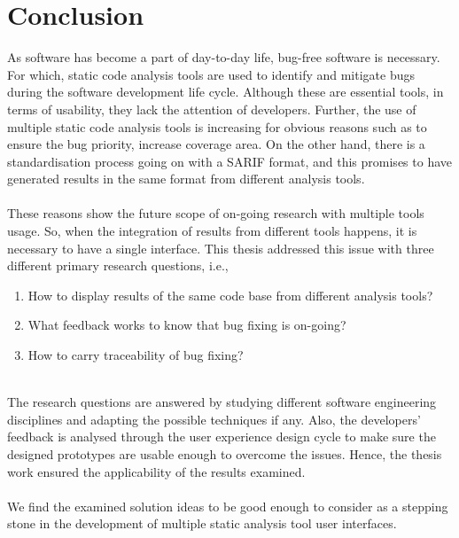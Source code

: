 \chapter{Conclusion}
\label{ch:conclusion_report}

As software has become a part of day-to-day life, bug-free software is necessary. For which, static code analysis tools are used to identify and mitigate bugs during the software development life cycle. Although these are essential tools, in terms of usability, they lack the attention of developers. Further, the use of multiple static code analysis tools is increasing for obvious reasons such as to ensure the bug priority, increase coverage area. On the other hand, there is a standardisation process going on with a SARIF format, \cite{sarif-git} and this promises to have generated results in the same format from different analysis tools. \\ \\

These reasons show the future scope of on-going research with multiple tools usage. So, when the integration of results from different tools happens, it is necessary to have a single interface. This thesis addressed this issue with three different primary research questions, i.e., \\ 
\begin{enumerate}
\item  How to display results of the same code base from different analysis tools?
\item  What feedback works to know that bug fixing is on-going?
\item  How to carry traceability of bug fixing? \\ \\
\end{enumerate}
The research questions are answered by studying different software engineering disciplines and adapting the possible techniques if any. Also, the developers’ feedback is analysed through the user experience design cycle to make sure the designed prototypes are usable enough to overcome the issues. Hence, the thesis work ensured the applicability of the results examined. \\ \\

We find the examined solution ideas to be good enough to consider as a stepping stone in the development of multiple static analysis tool user interfaces.